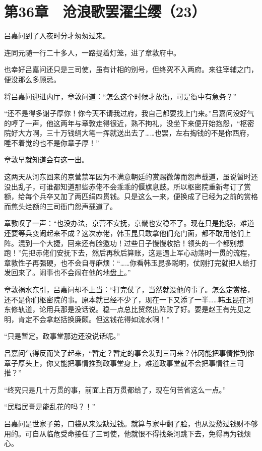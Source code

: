 \section{第36章　沧浪歌罢濯尘缨（23）}

吕嘉问到了入夜时分才匆匆过来。

连同元随一行二十多人，一路提着灯笼，进了章敦府中。

也幸好吕嘉问还只是三司使，虽有计相的别号，但终究不入两府。来往宰辅之门，便没那么多顾忌。

将吕嘉问迎进内厅，章敦问道：“怎么这个时候才放衙，可是衙中有急务？”

“还不是得多谢子厚你！你今天不请我过府，我自己都要找上门来。”吕嘉问没好气的哼了一声，他这两年与章敦走得很近，熟不拘礼，没坐下来便开始抱怨，“枢密院好大方啊，三十万钱绢大笔一挥就送出去了……也罢，左右掏钱的不是你西府，睡不着觉的也不是你章子厚！”

章敦早就知道会有这一出。

这两天从河东回来的京营禁军因为不满意朝廷的赏赐微薄而怨声载道，虽说暂时还没出乱子，可谁都知道那些赤佬不会乖乖的偃旗息鼓。所以枢密院重新考订了赏额，给每个兵卒又加了两匹绢四贯钱。只是这么一来，便换成了已经为之前的赏格而焦头烂额的三司衙门怨声载道了。

章敦叹了一声：“也没办法，京营不安抚，京畿也安稳不了。现在只是抱怨，难道还要等兵变闹起来不成？这次赤佬，韩玉昆只敢拿他们充门面，都不敢用他们上阵。混到一个大捷，回来还有脸邀功！过些日子慢慢收拾！领头的一个都别想跑！”先把赤佬们安抚下去，然后再秋后算账，这是遇上军心动荡时一贯的流程，章敦性子再强硬，也不会自寻麻烦：“……你看韩玉昆多聪明，仗刚打完就把人给打发回来了。闹事也不会闹在他的地盘上。”

章敦祸水东引，吕嘉问却不上当：“打完仗了，当然就没他的事了。怎么定赏格，还不是你们枢密院的事。原本就已经不少了，现在一下又添了一半……韩玉昆在河东修轨道，论用兵那是没话说。稳一点总比贸然出阵败了好。要是赵王有先见之明，肯定不会拿赵括换廉颇。但这钱花得如流水啊！”

“只是暂定。政事堂那边还没说话呢。”

吕嘉问气得反而笑了起来，“暂定？暂定的事会发到三司来？韩冈能把事情推到你章子厚头上，你又能把事情推到政事堂身上，难道政事堂就不会把事情往三司推？”

“终究只是几十万贯的事，前面上百万贯都给了，现在何苦省这么一点。”

“民脂民膏是能乱花的吗？！”

吕嘉问是世家子弟，口袋从来没缺过钱。就算与家中翻了脸，也从没愁过钱财不够用的。可自从临危受命接任了三司使，他就恨不得找条河跳下去，免得再为钱烦心。


